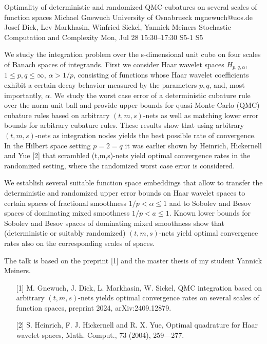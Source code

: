 \begin{talk}
  {Optimality of deterministic and randomized QMC-cubatures on several scales of function spaces}%
  {Michael Gnewuch}%
  {University of Osnabrueck}%
  {mgnewuch@uos.de}%
  {Josef Dick, Lev Markhasin, Winfried Sickel, Yannick Meiners}%
  {Stochastic Computation and Complexity}%
  {Mon, Jul 28 15:30–17:30}%
  {S5-1}%
  {S5}%
				
			
			
We study the integration problem over the s-dimensional unit cube on four scales of Banach spaces of integrands. First we consider Haar wavelet spaces $H_{p, q, \alpha}$, $1\le p, q \le \infty$, $\alpha > 1/p$, consisting of functions whose Haar wavelet coefficients exhibit a certain decay behavior measured by the parameters $p,q$, and, most importantly, $\alpha$.  We study the worst case error of a deterministic cubature rule over the norm unit ball 
and provide upper bounds for quasi-Monte Carlo (QMC) cubature rules based on arbitrary $(t,m,s)$-nets as well as matching lower error bounds for arbitrary cubature rules. These results show that using arbitrary $(t,m,s)$-nets as integration nodes yields the best possible rate of convergence. In the Hilbert space setting $p=2 = q$ it was earlier shown by Heinrich, Hickernell and Yue [2]  that scrambled (t,m,s)-nets yield optimal convergence rates in the randomized setting, where the randomized worst case error is considered. 

We establish several suitable function space embeddings that allow to transfer the deterministic and randomized upper error bounds on Haar wavelet spaces
to certain spaces of fractional smoothness $1/p < \alpha  \le 1$ and to Sobolev and Besov spaces of dominating mixed smoothness $1/p < a \le 1$.
Known lower bounds for Sobolev and Besov spaces of dominating mixed smoothness show that (deterministic or suitably randomized) $(t,m,s)$-nets yield optimal convergence rates also on the corresponding scales of spaces.			

The talk is based on the preprint [1] and the master thesis of my student Yannick Meiners.
\medskip

\begin{enumerate}
	\item[{[1]}] M. Gnewuch, J. Dick, L. Markhasin, W. Sickel, QMC integration based on arbitrary $(t,m,s)$-nets yields optimal convergence rates on several scales of function spaces, preprint 2024, arXiv:2409.12879. 
        \item[{[2]}] S. Heinrich, F. J. Hickernell and R. X. Yue, Optimal quadrature for Haar wavelet spaces, Math. Comput., 73 (2004), 259---277.
	\end{enumerate}

\end{talk}

